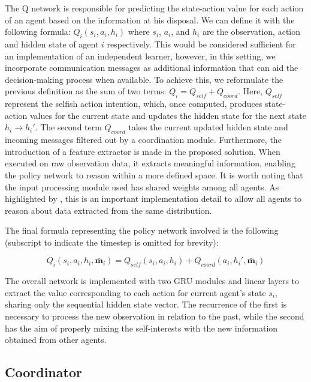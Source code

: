\documentclass[a4paper,singleside,12pt]{report} %
\begin{document}
The Q network is responsible for predicting the state-action value for each action of an agent based on the information at his disposal. We can define it with the following formula: $Q_i(s_i,a_i,h_i)$ where $s_i$, $a_i$, and $h_i$ are the observation, action and hidden state of agent $i$ respectively. This would be considered sufficient for an implementation of an independent learner, however, in this setting, we incorporate communication messages as additional information that can aid the decision-making process when available. To achieve this, we reformulate the previous definition as the sum of two terms: $Q_i = Q_{self} + Q_{coord}$. Here, $Q_{self}$ represent the selfish action intention, which, once computed, produces state-action values for the current state and updates the hidden state for the next state $h_i \rightarrow h_i'$. The second term $Q_{coord}$ takes the current updated hidden state and incoming messages filtered out by a coordination module. Furthermore, the introduction of a feature extractor is made in the proposed solution. When executed on raw observation data, it extracts meaningful information, enabling the policy network to reason within a more defined space. It is worth noting that the input processing module used has shared weights among all agents. As highlighted by \cite{Lin2021LearningTG}, this is an important implementation detail to allow all agents to reason about data extracted from the same distribution.

The final formula representing the policy network involved is the following (subscript to indicate the timestep is omitted for brevity):

  \begin{equation}
    Q_i(s_i,a_i,h_i,\bar{\textbf{m}}_i) = Q_{self}(s_i,a_i,h_i) + Q_{coord}(a_i,h_i',\bar{\textbf{m}}_i)
  \end{equation}
  
The overall network is implemented with two GRU modules and linear layers to extract the value corresponding to each action for current agent's state $s_i$, sharing only the sequential hidden state vector. The recurrence of the first is necessary to process the new observation in relation to the past, while the second has the aim of properly mixing the self-interests with the new information obtained from other agents.


\subsection{Coordinator}\label{coordinator}
\end{document}
